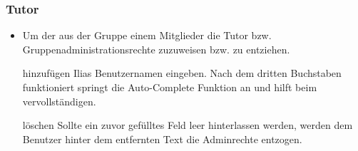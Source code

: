 \subsubsection{Tutor}
\begin{itemize}
	\item Um der aus der Gruppe einem Mitglieder die Tutor bzw. Gruppenadministrationsrechte zuzuweisen bzw. zu entziehen. 
	\item[hinzufügen] Ilias Benutzernamen eingeben. Nach dem dritten Buchstaben funktioniert springt die Auto-Complete Funktion an und hilft beim vervollständigen. 
	\item[löschen] Sollte ein zuvor gefülltes Feld leer hinterlassen werden, werden dem Benutzer hinter dem entfernten Text die Adminrechte entzogen.
\end{itemize}

